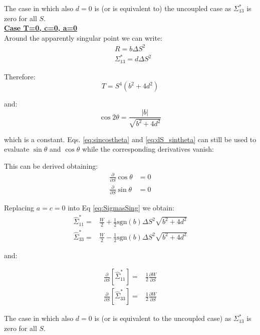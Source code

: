 The case in which also $d=0$ is (or is equivalent to) the uncoupled case as $\Sigma^*_{13}$ is zero for all $S$.
~\\


\textbf{\underline{Case T=0, c=0, a=0}}
~\\

Around the apparently singular point we can write:
\begin{align}
&R = b \Delta S^2\\
&\Sigma^*_{13} =d \Delta S^2
\end{align}

Therefore:
\begin{equation}
T = S^4\left( b^2 + 4 d^2\right)
\end{equation}

and:
\begin{equation}
\cos 2 \theta = \frac{\left|b\right|}{\sqrt{b^2+4d^2}}
\end{equation}

which is a constant. Eqs. \ref{eq:sincostheta} and \ref{eq:dS_sintheta} can still be used to evaluate $\sin \theta$ and $\cos \theta$ while the corresponding derivatives vanish:

This can be derived obtaining:
\begin{align}
\frac{\partial }{\partial S} \cos \theta &= 0\\
\frac{\partial }{\partial S} \sin \theta &= 0
\end{align}

Replacing $a=c=0$ into Eq \ref{eq:SigmasSing} we obtain:
\begin{align}
\hat{\Sigma}^*_{11}  =& \frac{W}{2}
+\frac{1}{2}\mathrm{sgn}(b)\Delta S^2\sqrt{b^2+4d^2} \\
\hat{\Sigma}^*_{33} =& \frac{W}{2}
-\frac{1}{2}\mathrm{sgn}(b)\Delta S^2\sqrt{b^2+4d^2}
\end{align}

and:

\begin{align}
\frac{\partial }{\partial S} \left[\hat{\Sigma}^*_{11} \right] =& \frac{1}{2}\frac{\partial W }{\partial S}\\
\frac{\partial }{\partial S} \left[\hat{\Sigma}^*_{33} \right] =& \frac{1}{2}\frac{\partial W }{\partial S}
\end{align}

The case in which also $d=0$ is (or is equivalent to the uncoupled case) as $\Sigma^*_{13}$ is zero for all $S$.




